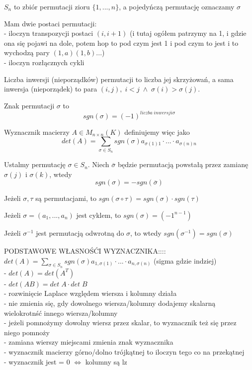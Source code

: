 \documentclass{article}
\begin{document}
\begin{multicols*}{2}
    $S_n$ to zbiór permutacji zioru $\{1, ..., n\}$, a pojedyńczą permutację oznaczamy $\sigma$\bigskip

    Mam {\color{def}dwie postaci permutacji}:\smallskip\\
    \indent - {\color{acc}iloczyn transpozycji} postaci $(i, i+1)$ (i tutaj ogółem patrzymy na 1, i gdzie ona się pojawi na dole, potem hop to pod czym jest 1 i pod czym to jest i to wychodzą pary $(1, a)(1, b)...$)\\
    \indent - {\color{acc}iloczyn rozłącznych cykli}


    {\color{def}Liczba inwersji} (nieporządków) permutacji to liczba jej skrzyżowań, a sama {\color{def}inwersja} (nieporządek) to para $(i, j),\;i<j\;\land\;\sigma(i)>\sigma(j)$.\bigskip

    {\color{def}Znak permutacji} $\sigma$ to 
    $$sgn(\sigma)=(-1)^{liczba \;inwersji \sigma}$$

    {\color{def}Wyznacznik} macierzy $A\in M_{n\times n}(K)$ definiujemy więc jako
    $$det(A)=\sum\limits_{\sigma\in S_n}sgn(\sigma)a_{\sigma(1)1}\cdot...\cdot a_{\sigma(n)n}$$

    Ustalmy permutację $\sigma\in S_n$. Niech $\overline \sigma$ będzie permutacją powstałą przez zamianę $\sigma(j)$ i $\sigma(k)$, wtedy
    $$sgn(\sigma)=-sgn(\overline\sigma)$$

    Jeżeli $\sigma, \tau$ są permutacjami, to $sgn(\sigma\circ\tau)=sgn(\sigma)\cdot sgn(\tau)$\bigskip

    Jeżeli $\sigma = (a_1, ..., a_n)$ jest cyklem, to $sgn (\sigma)=(-1^{n-1})$\bigskip

    Jeżeli $\sigma^{-1}$ jest permutacją odwrotną do $\sigma$, to wtedy $sgn(\sigma^{-1})=sgn(\sigma)$


    {\color{title-color}PODSTAWOWE WŁASNOŚĆI WYZNACZNIKA::::}\medskip\\
    \indent $det(A)=\sum\limits_{\sigma\in S_n}sgn(\sigma)a_{1, \sigma(1)}\cdot...\cdot a_{n, \sigma(n)}$ (sigma gdzie indziej)\\
    \indent - $det(A)=det(A^T)$\\
    \indent - $det(AB)=det\;A\cdot det\;B$\\
    \indent - rozwinięcie Laplace względem wiersza i kolumny działa \\
    \indent - nie zmienia się, gdy dowolnego wiersza/kolumny dodajemy skalarną wielokrotnść innego wiersza/kolumny\\
    \indent - jeżeli pomnożymy dowolny wiersz przez skalar, to wyznacznik też się przez niego pomnoży\\
    \indent - zamiana wierszy miejscami zmienia znak wyznacznika\\
    \indent - wyznacznik macierzy górno/dolno trójkątnej to iloczyn tego co na przekątnej\\
    \indent - wyznacznik jest = 0 $\iff$ kolumny są lz


\end{multicols*}
\end{document}
